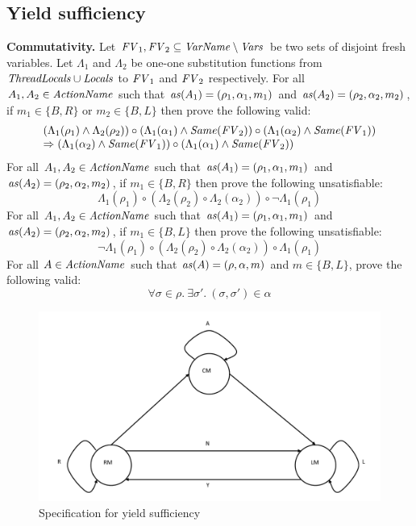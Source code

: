 \subsection{Yield sufficiency}

{\bf Commutativity.}
Let $\mathit{FV}_1,\mathit{FV}_2 \subseteq \mathit{VarName} \setminus \mathit{Vars}$ be two sets of disjoint fresh variables.
Let $\Lambda_1$ and $\Lambda_2$ be one-one 
substitution functions from $\mathit{ThreadLocals} \cup \mathit{Locals}$ to $\mathit{FV}_1$ and $\mathit{FV}_2$ respectively.
For all $A_1,A_2 \in \mathit{ActionName}$ such that $\mathit{as}(A_1) = (\rho_1,\alpha_1,m_1)$ and $\mathit{as}(A_2) = (\rho_2,\alpha_2,m_2)$,
if $m_1 \in \{B,R\}$ or $m_2 \in \{B,L\}$ then prove the following valid:
\[
\begin{array}{l}
(\Lambda_1(\rho_1) \wedge \Lambda_2(\rho_2)) \circ (\Lambda_1(\alpha_1) \wedge \mathit{Same}(\mathit{FV}_2)) \circ (\Lambda_1(\alpha_2) \wedge \mathit{Same}(\mathit{FV}_1)) \\ 
\Rightarrow (\Lambda_1(\alpha_2) \wedge \mathit{Same}(\mathit{FV}_1)) \circ (\Lambda_1(\alpha_1) \wedge \mathit{Same}(\mathit{FV}_2))
\end{array}
\]
For all $A_1,A_2 \in \mathit{ActionName}$ such that $\mathit{as}(A_1) = (\rho_1,\alpha_1,m_1)$ and $\mathit{as}(A_2) = (\rho_2,\alpha_2,m_2)$,
if $m_1 \in \{B,R\}$ then prove the following unsatisfiable:
\[
\Lambda_1(\rho_1) \circ (\Lambda_2(\rho_2) \circ \Lambda_2(\alpha_2)) \circ \neg \Lambda_1(\rho_1)
\]
For all $A_1,A_2 \in \mathit{ActionName}$ such that $\mathit{as}(A_1) = (\rho_1,\alpha_1,m_1)$ and $\mathit{as}(A_2) = (\rho_2,\alpha_2,m_2)$,
if $m_1 \in \{B,L\}$ then prove the following unsatisfiable:
\[
\neg \Lambda_1(\rho_1) \circ (\Lambda_2(\rho_2) \circ \Lambda_2(\alpha_2)) \circ \Lambda_1(\rho_1)
\]
For all $A \in \mathit{ActionName}$ such that $\mathit{as}(A) = (\rho,\alpha,m)$ and $m \in \{B, L\}$,
prove the following valid:
\[
\forall \sigma \in \rho.\ \exists \sigma'.\ (\sigma, \sigma') \in \alpha
\]

\begin{figure}
\includegraphics[scale=0.35]{YieldTypeCheckingAutomaton.pdf}
\caption{Specification for yield sufficiency}
\label{fig:YieldTypeCheckingAutomaton}
\end{figure}

